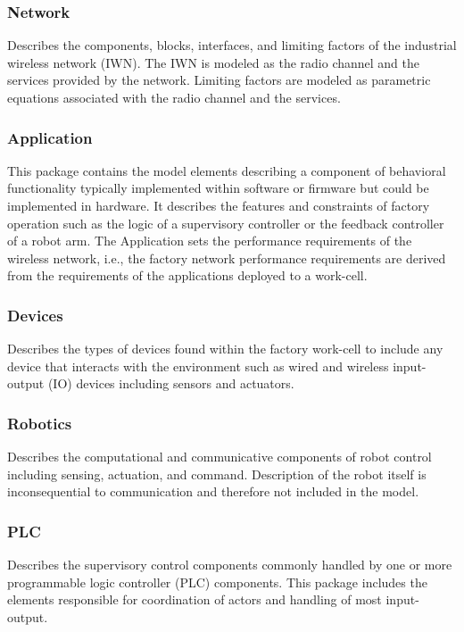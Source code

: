 \documentclass[journal, twoside]{IEEEtran}
\begin{document}
	\subsubsection{Network} Describes the components, blocks, interfaces, and limiting factors of the industrial wireless network (IWN).  The IWN is modeled as the radio channel and the services provided by the network. Limiting factors are modeled as parametric equations associated with the radio channel and the services.
	
	\subsubsection{Application}  This package contains the model elements describing a component of behavioral functionality typically implemented within software or firmware but could be implemented in hardware.  It describes the features and constraints of factory operation such as the logic of a supervisory controller or the feedback controller of a robot arm.  The Application sets the performance requirements of the wireless network, i.e., the factory network performance requirements are derived from the requirements of the applications deployed to a work-cell.
	
	\subsubsection{Devices} Describes the types of devices found within the factory work-cell to include any device that interacts with the environment such as wired and wireless input-output (IO) devices including sensors and actuators.
	
	\subsubsection{Robotics} Describes the computational and communicative components of robot control including sensing, actuation, and command.  Description of the robot itself is inconsequential to communication and therefore not included in the model.
	
	\subsubsection{PLC} Describes the supervisory control components commonly handled by one or more programmable logic controller (PLC) components.  This package includes the elements responsible for coordination of actors and handling of most input-output.
	
\end{document}
